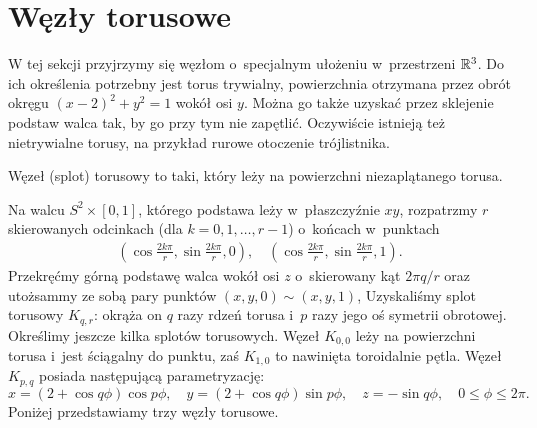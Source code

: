 \section{Węzły torusowe} %
\label{sec:torus}
W tej sekcji przyjrzymy się węzłom o~specjalnym ułożeniu w~przestrzeni $\mathbb R^3$.
Do ich określenia potrzebny jest torus trywialny,
powierzchnia otrzymana przez obrót okręgu $(x-2)^2 + y^2 = 1$ wokół osi $y$.
Można go także uzyskać przez sklejenie podstaw walca tak, by go przy tym nie zapętlić.
Oczywiście istnieją też nietrywialne torusy, na przykład rurowe otoczenie trójlistnika.

\begin{definition}
    Węzeł (splot) torusowy to taki, który leży na powierzchni niezaplątanego torusa.
\end{definition}

Na walcu $S^2 \times [0,1]$, którego podstawa leży w~płaszczyźnie $xy$, rozpatrzmy $r$ skierowanych odcinkach (dla $k = 0, 1, \ldots, r - 1$) o~końcach w~punktach
\begin{align*}
    \left(\cos \frac{2k \pi}{r}, \sin \frac{2k\pi}{r}, 0 \right), \quad
    \left(\cos \frac{2k \pi}{r}, \sin \frac{2k\pi}{r}, 1 \right).
\end{align*}
Przekręćmy górną podstawę walca wokół osi $z$ o~skierowany kąt $2\pi q / r$ oraz utożsammy ze sobą pary punktów $(x, y, 0) \sim (x, y, 1)$,
Uzyskaliśmy splot torusowy $K_{q, r}$: okrąża on $q$ razy rdzeń torusa i~$p$ razy jego oś symetrii obrotowej.
Określimy jeszcze kilka splotów torusowych.
Węzeł $K_{0, 0}$ leży na powierzchni torusa i~jest ściągalny do punktu, zaś $K_{1, 0}$ to nawinięta toroidalnie pętla.
Węzeł $K_{p, q}$ posiada następującą parametryzację:
\[
    x = (2+\cos q \phi) \cos p \phi, \quad
    y = (2+\cos q \phi) \sin p \phi, \quad
    z = - \sin q \phi, \quad
    0 \le \phi \le 2\pi.
\]
Poniżej przedstawiamy trzy węzły torusowe.

